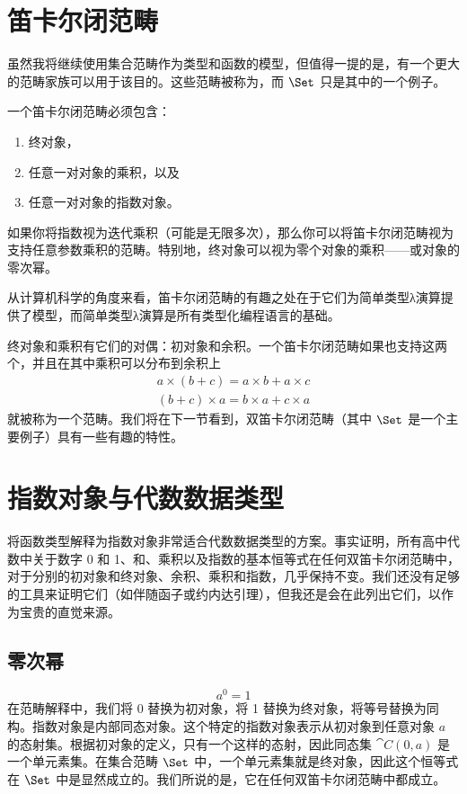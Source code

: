 \section{笛卡尔闭范畴}

虽然我将继续使用集合范畴作为类型和函数的模型，但值得一提的是，有一个更大的范畴家族可以用于该目的。这些范畴被称为，而 $\Set$ 只是其中的一个例子。

一个笛卡尔闭范畴必须包含：

\begin{enumerate}
  \tightlist
  \item
  终对象，
  \item
  任意一对对象的乘积，以及
  \item
  任意一对对象的指数对象。
\end{enumerate}
如果你将指数视为迭代乘积（可能是无限多次），那么你可以将笛卡尔闭范畴视为支持任意参数乘积的范畴。特别地，终对象可以视为零个对象的乘积——或对象的零次幂。

从计算机科学的角度来看，笛卡尔闭范畴的有趣之处在于它们为简单类型λ演算提供了模型，而简单类型λ演算是所有类型化编程语言的基础。

终对象和乘积有它们的对偶：初对象和余积。一个笛卡尔闭范畴如果也支持这两个，并且在其中乘积可以分布到余积上
\begin{gather*}
  a \times (b + c) = a \times b + a \times c \\
  (b + c) \times a = b \times a + c \times a
\end{gather*}
就被称为一个范畴。我们将在下一节看到，双笛卡尔闭范畴（其中 $\Set$ 是一个主要例子）具有一些有趣的特性。

\section{指数对象与代数数据类型}

将函数类型解释为指数对象非常适合代数数据类型的方案。事实证明，所有高中代数中关于数字 0 和 1、和、乘积以及指数的基本恒等式在任何双笛卡尔闭范畴中，对于分别的初对象和终对象、余积、乘积和指数，几乎保持不变。我们还没有足够的工具来证明它们（如伴随函子或约内达引理），但我还是会在此列出它们，以作为宝贵的直觉来源。

\subsection{零次幂}

\[a^{0} = 1\]
在范畴解释中，我们将 0 替换为初对象，将 1 替换为终对象，将等号替换为同构。指数对象是内部同态对象。这个特定的指数对象表示从初对象到任意对象 $a$ 的态射集。根据初对象的定义，只有一个这样的态射，因此同态集 $\cat{C}(0, a)$ 是一个单元素集。在集合范畴 $\Set$ 中，一个单元素集就是终对象，因此这个恒等式在 $\Set$ 中是显然成立的。我们所说的是，它在任何双笛卡尔闭范畴中都成立。

